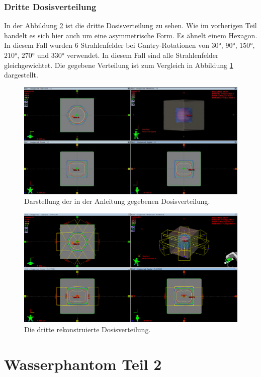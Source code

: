 \subsubsection{Dritte Dosisverteilung}
In der Abbildung \ref{fig:dritteverteilung} ist die dritte Dosisverteilung zu sehen. Wie im vorherigen Teil handelt es sich hier auch um eine asymmetrische Form. Es ähnelt einem Hexagon. In diesem Fall wurden 6 Strahlenfelder bei Gantry-Rotationen von $30°$, $90°$, $150°$, $210°$, $270°$ und $330°$ verwendet. In diesem Fall sind alle Strahlenfelder gleichgewichtet.
Die gegebene Verteilung ist zum Vergleich in Abbildung \ref{abb:dritteverteilung}
dargestellt.

\begin{figure}[H]
	\centering
	\includegraphics[width=0.7\linewidth]{../../Wasserphantom Bilder/AnleitungdritteVerteilung.png}
	\caption{Darstellung der in der Anleitung gegebenen Dosisverteilung. \cite{Anleitung}}
	\label{abb:dritteverteilung}
\end{figure}

\begin{figure}[H]
	\centering
	\includegraphics[width=0.7\linewidth]{../../Wasserphantom Bilder/dritteVerteilung.png}
	\caption{Die dritte rekonstruierte Dosisverteilung.}
	\label{fig:dritteverteilung}
\end{figure}


\section{Wasserphantom Teil 2}
\label{sec:Wasserphantom2}

